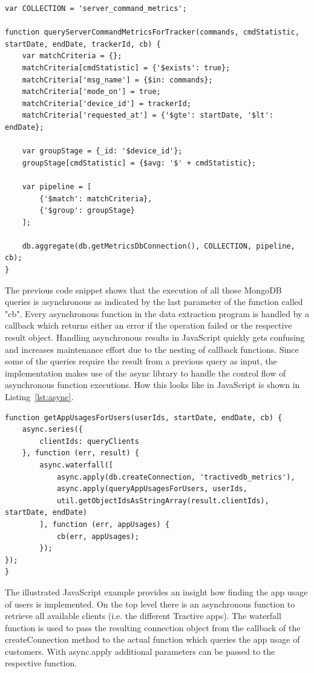 \begin{lstlisting}[caption={Aggregation query on server command metrics collection},label={lst:aggregation}]
var COLLECTION = 'server_command_metrics';

function queryServerCommandMetricsForTracker(commands, cmdStatistic, startDate, endDate, trackerId, cb) {
	var matchCriteria = {};
	matchCriteria[cmdStatistic] = {'$exists': true};
	matchCriteria['msg_name'] = {$in: commands};
	matchCriteria['mode_on'] = true;
	matchCriteria['device_id'] = trackerId;
	matchCriteria['requested_at'] = {'$gte': startDate, '$lt': endDate};
	
	var groupStage = {_id: '$device_id'};
	groupStage[cmdStatistic] = {$avg: '$' + cmdStatistic};
	
	var pipeline = [
		{'$match': matchCriteria},
		{'$group': groupStage}
	];
	
	db.aggregate(db.getMetricsDbConnection(), COLLECTION, pipeline, cb);
}
\end{lstlisting}

The previous code snippet shows that the execution of all those MongoDB queries is asynchronous as indicated by the last parameter of the function called "cb". Every asynchronous function in the data extraction program is handled by a callback which returns either an error if the operation failed or the respective result object. Handling asynchronous results in JavaScript quickly gets confusing and increases maintenance effort due to the nesting of callback functions. Since some of the queries require the result from a previous query as input, the implementation makes use of the async library to handle the control flow of asynchronous function executions. How this looks like in JavaScript is shown in Listing~\ref{lst:async}.

\begin{lstlisting}[caption={Example of using async for handling the control flow of asnychronous database queries}, 
label={lst:async}]
function getAppUsagesForUsers(userIds, startDate, endDate, cb) {
	async.series({
		clientIds: queryClients
	}, function (err, result) {
		async.waterfall([
			async.apply(db.createConnection, 'tractivedb_metrics'),
			async.apply(queryAppUsagesForUsers, userIds, 
			util.getObjectIdsAsStringArray(result.clientIds), startDate, endDate)
		], function (err, appUsages) {
			cb(err, appUsages);
		});
});
}
\end{lstlisting}

The illustrated JavaScript example provides an insight how finding the app usage of users is implemented. On the top level there is an asynchronous function to retrieve all available clients (i.e. the different Tractive apps). The waterfall function is used to pass the resulting connection object from the callback of the createConnection method to the actual function which queries the app usage of customers. With async.apply additional parameters can be passed to the respective function. 

